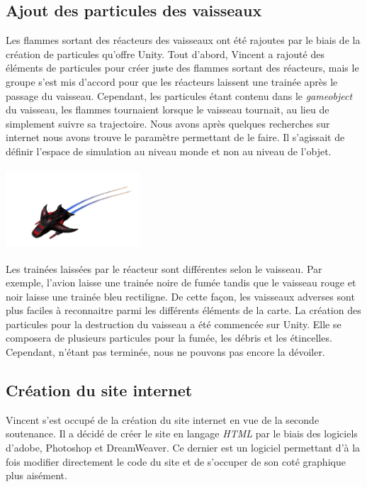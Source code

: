 \documentclass[10pt, titlepage]{report}
\begin{document}
\subsection{Ajout des particules des vaisseaux}
Les flammes sortant des réacteurs des vaisseaux ont été rajoutes par le biais de la création de particules qu'offre Unity. Tout d'abord, Vincent a rajouté des éléments de particules pour créer juste des flammes sortant des réacteurs, mais le groupe s'est mis d'accord pour que les réacteurs laissent une trainée après le passage du vaisseau. Cependant, les particules étant contenu dans le \textit{gameobject} du vaisseau, les flammes tournaient lorsque le vaisseau tournait, au lieu de simplement suivre sa trajectoire. Nous avons après quelques recherches sur internet nous avons trouve le paramètre permettant de le faire. Il s'agissait de définir l'espace de simulation au niveau monde et non au niveau de l'objet.\\

\begin{center}
\includegraphics[height=3cm, width=5cm]{vaisseau_bouge.png}
\end{center}

Les trainées laissées par le réacteur sont différentes selon le vaisseau. Par exemple, l'avion laisse une trainée noire de fumée tandis que le vaisseau rouge et noir laisse une trainée bleu rectiligne. De cette façon, les vaisseaux adverses sont plus faciles à reconnaitre parmi les différents éléments de la carte. La création des particules pour la destruction du vaisseau a été commencée sur Unity. Elle se composera de plusieurs particules pour la fumée, les débris et les étincelles. Cependant, n’étant pas terminée, nous ne pouvons pas encore la dévoiler.  \\

\subsection{Création du site internet}
Vincent s'est occupé de la création du site internet en vue de la seconde soutenance. Il a décidé de créer le site en langage \textit{HTML} par le biais des logiciels d'adobe, Photoshop et DreamWeaver. Ce dernier est un logiciel permettant d'à la fois modifier directement le code du site et de s'occuper de son coté graphique plus aisément.\\
\end{document}
